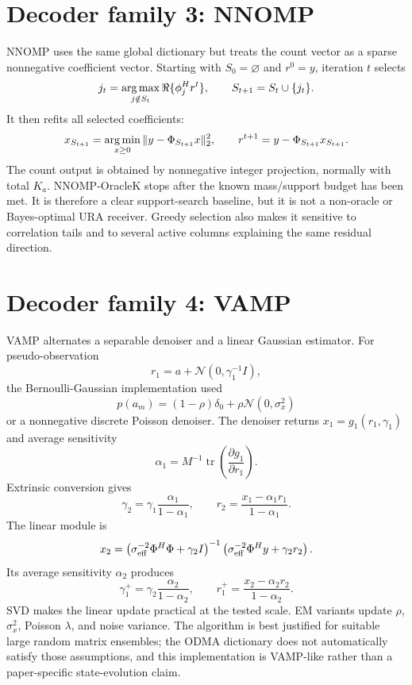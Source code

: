 \documentclass[11pt]{article}
\begin{document}
\section{Decoder family 3: NNOMP}

NNOMP uses the same global dictionary but treats the count vector as a sparse nonnegative coefficient vector. Starting
with $S_0=\varnothing$ and $r^0=y$, iteration $t$ selects
\[
 j_t=\operatorname*{arg\,max}_{j\notin S_t}\Re\{\phi_j^Hr^t\},\qquad S_{t+1}=S_t\cup\{j_t\}.
\]
It then refits all selected coefficients:
\[
 x_{S_{t+1}}=\operatorname*{arg\,min}_{x\ge0}\|y-\Phi_{S_{t+1}}x\|_2^2,
 \qquad r^{t+1}=y-\Phi_{S_{t+1}}x_{S_{t+1}}.
\]
The count output is obtained by nonnegative integer projection, normally with total $K_a$. NNOMP-OracleK stops after
the known mass/support budget has been met. It is therefore a clear support-search baseline, but it is not a non-oracle
or Bayes-optimal URA receiver. Greedy selection also makes it sensitive to correlation tails and to several active
columns explaining the same residual direction.

\section{Decoder family 4: VAMP}

VAMP alternates a separable denoiser and a linear Gaussian estimator. For pseudo-observation
\[
 r_1=a+\mathcal N(0,\gamma_1^{-1}I),
\]
the Bernoulli-Gaussian implementation used
\[
 p(a_m)=(1-\rho)\delta_0+\rho\mathcal N(0,\sigma_x^2)
\]
or a nonnegative discrete Poisson denoiser. The denoiser returns $x_1=g_1(r_1,\gamma_1)$ and average sensitivity
\[
 \alpha_1=M^{-1}\operatorname{tr}\left(\frac{\partial g_1}{\partial r_1}\right).
\]
Extrinsic conversion gives
\[
 \gamma_2=\gamma_1\frac{\alpha_1}{1-\alpha_1},
 \qquad r_2=\frac{x_1-\alpha_1r_1}{1-\alpha_1}.
\]
The linear module is
\[
 x_2=\left(\sigma_{\rm eff}^{-2}\Phi^H\Phi+\gamma_2I\right)^{-1}
 \left(\sigma_{\rm eff}^{-2}\Phi^Hy+\gamma_2r_2\right).
\]
Its average sensitivity $\alpha_2$ produces
\[
 \gamma_1^+=\gamma_2\frac{\alpha_2}{1-\alpha_2},
 \qquad r_1^+=\frac{x_2-\alpha_2r_2}{1-\alpha_2}.
\]
SVD makes the linear update practical at the tested scale. EM variants update $\rho$, $\sigma_x^2$, Poisson $\lambda$,
and noise variance. The algorithm is best justified for suitable large random matrix ensembles; the ODMA dictionary
does not automatically satisfy those assumptions, and this implementation is VAMP-like rather than a paper-specific
state-evolution claim.
\end{document}
